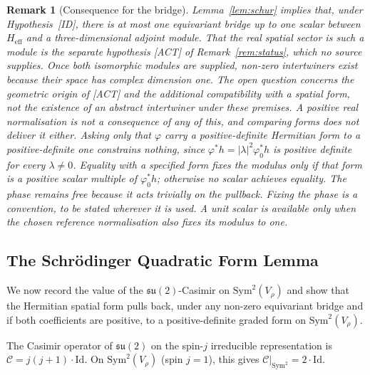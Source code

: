 \documentclass[11pt,a4paper]{article}
\newtheorem{remark}[theorem]{Remark}
\newcommand{\Heff}{H_{\mathrm{eff}}}
\newcommand{\su}{\mathfrak{su}}
\newcommand{\Vr}{V_\rho}
\newcommand{\Sym}{\mathrm{Sym}}
\begin{document}
    \begin{remark}[Consequence for the bridge]
      \label{rem:rigidity}
      Lemma~\ref{lem:schur} implies that, under Hypothesis~[ID], \emph{there is at most one
      equivariant bridge up to one scalar} between $\Heff$ and a three-dimensional adjoint module.
      That the real spatial sector \emph{is} such a module is the separate hypothesis [ACT] of
      Remark~\ref{rem:status}, which no source supplies.
      Once both isomorphic modules are supplied, non-zero intertwiners exist because their
      space has complex dimension one.
      The open question concerns the geometric origin of [ACT] and the additional compatibility
      with a spatial form, not the existence of an abstract intertwiner under these premises.
      A \emph{positive real} normalisation is not a consequence of any of this, and comparing forms
      does not deliver it either.
      Asking only that $\varphi$ carry a positive-definite Hermitian form to a positive-definite
      one constrains nothing, since
      $\varphi^*h=|\lambda|^2\varphi_0^*h$ is positive definite for every $\lambda\neq0$.
      Equality with a specified form fixes the modulus only if that form is a positive scalar
      multiple of $\varphi_0^*h$; otherwise no scalar achieves equality.
      The phase remains free because it acts trivially on the pullback.
      Fixing the phase is a convention, to be stated wherever it is used.
      A unit scalar is available only when the chosen reference normalisation also fixes its
      modulus to one.
    \end{remark}

  \subsection{The Schr\"odinger Quadratic Form Lemma}
    \label{sec:qform}

    We now record the value of the $\su(2)$-Casimir on $\Sym^2(\Vr)$ and show that the Hermitian
    spatial form pulls back, under any non-zero equivariant bridge and if both coefficients are
    positive, to a positive-definite graded form on $\Sym^2(\Vr)$.

    The Casimir operator of $\su(2)$ on the spin-$j$ irreducible representation is
    $\mathcal{C} = j(j+1) \cdot \mathrm{Id}$.
    On $\Sym^2(\Vr)$ (spin $j = 1$), this gives $\mathcal{C}|_{\Sym^2} = 2 \cdot \mathrm{Id}$.
\end{document}
